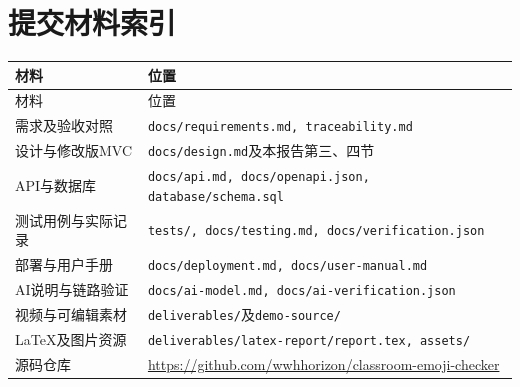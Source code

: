 \documentclass[UTF8,a4paper,zihao=-4,fontset=fandol]{ctexart}
\begin{document}
\clearpage
\appendix
\section{提交材料索引}
\begin{longtable}{p{4.5cm}p{9.65cm}}
\toprule 材料 & 位置\\\midrule\endfirsthead
\toprule 材料 & 位置\\\midrule\endhead
需求及验收对照 & \texttt{docs/requirements.md, traceability.md}\\
设计与修改版MVC & \texttt{docs/design.md}及本报告第三、四节\\
API与数据库 & \texttt{docs/api.md, docs/openapi.json, database/schema.sql}\\
测试用例与实际记录 & \texttt{tests/, docs/testing.md, docs/verification.json}\\
部署与用户手册 & \texttt{docs/deployment.md, docs/user-manual.md}\\
AI说明与链路验证 & \texttt{docs/ai-model.md, docs/ai-verification.json}\\
视频与可编辑素材 & \texttt{deliverables/}及\texttt{demo-source/}\\
LaTeX及图片资源 & \texttt{deliverables/latex-report/report.tex, assets/}\\
源码仓库 & \url{https://github.com/wwhhorizon/classroom-emoji-checker}\\
\bottomrule\end{longtable}
\end{document}
